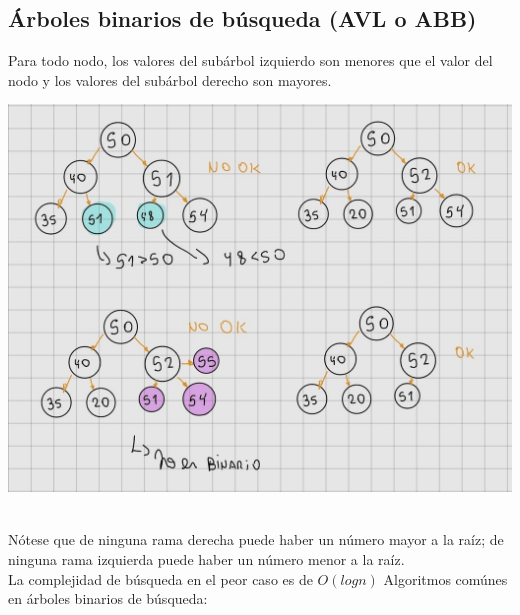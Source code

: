 \documentclass[10pt,a4paper]{article}
\begin{document}
\subsection*{Árboles binarios de búsqueda (AVL o ABB)}
Para todo nodo, los valores del subárbol izquierdo son menores que el valor del nodo y los valores del subárbol derecho son mayores. \\ 
\begin{minipage}[b]{0.8\textwidth}
    \includegraphics[width=\linewidth]{assets/abb-1.jpg}
    \centering
    \label{fig:abb-1}
\end{minipage} \\ 
Nótese que de ninguna rama derecha puede haber un número mayor a la raíz; de ninguna rama izquierda puede haber un número menor a la raíz. \\ 
La complejidad de búsqueda en el peor caso es de $O(log n)$
Algoritmos comúnes en árboles binarios de búsqueda:
\end{document}
